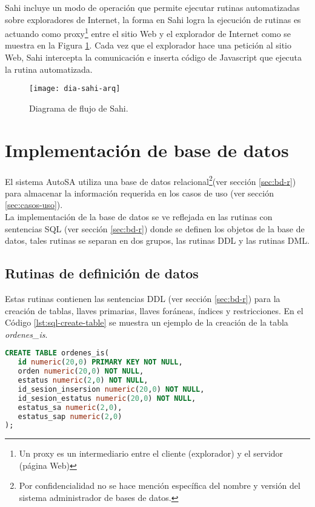 Sahi incluye un modo de operación que permite ejecutar rutinas automatizadas sobre exploradores de Internet, la forma en Sahi logra la ejecución de rutinas es actuando como proxy\footnote{Un proxy es un intermediario entre el cliente (explorador) y el servidor (página Web)\cite{BeginningUbuntuLinux}} entre el sitio Web y el explorador de Internet como se muestra en la Figura \ref{fig:dia-sahi-arq}. Cada vez que el explorador hace una petición al sitio Web, Sahi intercepta la comunicación e inserta código de Javascript que ejecuta la rutina automatizada.\cite{WebEng9IntConf, SahiPro}

\begin{figure}[h]
\centering
\texttt{[image: dia-sahi-arq]}
\caption{Diagrama de flujo de Sahi\cite{SahiPro}.}
\label{fig:dia-sahi-arq}
\end{figure}

%

\section{Implementación de base de datos}\label{sec:impl-db}
El sistema AutoSA utiliza una base de datos relacional\footnote{Por confidencialidad no se hace mención específica del nombre y versión del sistema administrador de bases de datos.}(ver sección \ref{sec:bd-r}) para almacenar la información requerida en los casos de uso (ver sección \ref{sec:casos-uso}).\\
La implementación de la base de datos se ve reflejada en las rutinas con sentencias SQL (ver sección \ref{sec:bd-r}) donde se definen los objetos de la base de datos, tales rutinas se separan en dos grupos, las rutinas DDL y las rutinas DML.

\subsection{Rutinas de definición de datos}
Estas rutinas contienen las sentencias DDL (ver sección \ref{sec:bd-r}) para la creación de tablas, llaves primarias, llaves foráneas, índices y restricciones. En el Código \ref{lst:sql-create-table} se muestra un ejemplo de la creación de la tabla \textit{ordenes\_is}.
\begin{lstlisting}[language=SQL, caption={Sentencia para crear una tabla.}, captionpos=b, label={lst:sql-create-table}]
CREATE TABLE ordenes_is(
   id numeric(20,0) PRIMARY KEY NOT NULL,
   orden numeric(20,0) NOT NULL,
   estatus numeric(2,0) NOT NULL,
   id_sesion_insersion numeric(20,0) NOT NULL,
   id_sesion_estatus numeric(20,0) NOT NULL,
   estatus_sa numeric(2,0),
   estatus_sap numeric(2,0)
);
\end{lstlisting}

